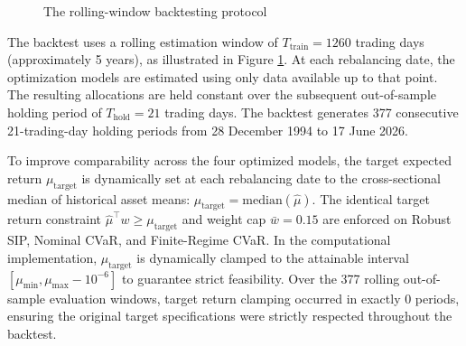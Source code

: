 \documentclass[smallextended]{svjour3}
\begin{document}
\begin{figure}[htbp]
\centering
{}
\caption{The rolling-window backtesting protocol}
\label{fig:schema3}
\end{figure}

The backtest uses a rolling estimation window of $T_{\text{train}} = 1260$ trading days (approximately 5 years), as illustrated in Figure \ref{fig:schema3}. At each rebalancing date, the optimization models are estimated using only data available up to that point. The resulting allocations are held constant over the subsequent out-of-sample holding period of $T_{\text{hold}} = 21$ trading days. The backtest generates 377 consecutive 21-trading-day holding periods from 28 December 1994 to 17 June 2026.

To improve comparability across the four optimized models, the target expected return $\mu_{\text{target}}$ is dynamically set at each rebalancing date to the cross-sectional median of historical asset means: $\mu_{\text{target}} = \text{median}(\hat{\mu})$. The identical target return constraint $\hat{\mu}^\top w \ge \mu_{\text{target}}$ and weight cap $\bar{w} = 0.15$ are enforced on Robust SIP, Nominal CVaR, and Finite-Regime CVaR. In the computational implementation, $\mu_{\text{target}}$ is dynamically clamped to the attainable interval $[\mu_{\min}, \mu_{\max} - 10^{-6}]$ to guarantee strict feasibility. Over the 377 rolling out-of-sample evaluation windows, target return clamping occurred in exactly 0 periods, ensuring the original target specifications were strictly respected throughout the backtest.
\end{document}
